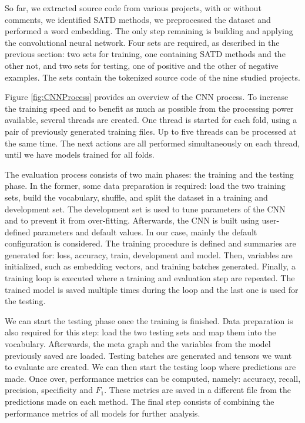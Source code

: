 So far, we extracted source code from various projects, with or without comments, we identified SATD methods, we preprocessed the dataset and performed a word embedding. The only step remaining is building and applying the convolutional neural network. Four sets are required, as described in the previous section: two sets for training, one containing SATD methods and the other not, and two sets for testing, one of positive and the other of negative examples. The sets contain the tokenized source code of the nine studied projects.

Figure \ref{fig:CNNProcess} provides an overview of the CNN process. To increase the training speed and to benefit as much as possible from the processing power available, several threads are created. One thread is started for each fold, using a pair of previously generated training files. Up to five threads can be processed at the same time. The next actions are all performed simultaneously on each thread, until we have models trained for all folds. 

The evaluation process consists of two main phases: the training and the testing phase. In the former, some data preparation is required: load the two training sets, build the vocabulary, shuffle, and split the dataset in a training and development set. The development set is used to tune parameters of the CNN and to prevent it from over-fitting. Afterwards, the CNN is built using user-defined parameters and default values. In our case, mainly the default configuration is considered. The training procedure is defined and summaries are generated for: loss, accuracy, train, development and model. Then, variables are initialized, such as embedding vectors, and training batches generated. Finally, a training loop is executed where a training and evaluation step are repeated. The trained model is saved multiple times during the loop and the last one is used for the testing. 

We can start the testing phase once the training is finished. Data preparation is also required for this step: load the two testing sets and map them into the vocabulary. Afterwards, the meta graph and the variables from the model previously saved are loaded. Testing batches are generated and tensors we want to evaluate are created. We can then start the testing loop where predictions are made. Once over, performance metrics can be computed,  namely: accuracy, recall, precision, specificity and $F_1$. These metrics are saved in a different file from the predictions made on each method. The final step consists of combining the performance metrics of all models for further analysis.

